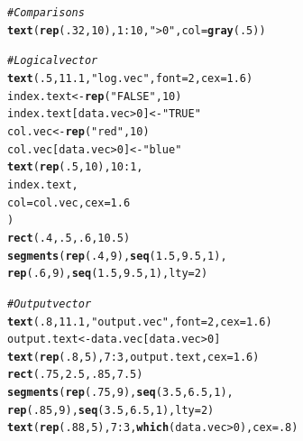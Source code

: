 \documentclass{tufte-book}\usepackage[]{graphicx}\usepackage[]{color}
\makeatletter
\newcommand{\hlnum}[1]{\textcolor[rgb]{0.686,0.059,0.569}{#1}}%
\newcommand{\hlstr}[1]{\textcolor[rgb]{0.192,0.494,0.8}{#1}}%
\newcommand{\hlcom}[1]{\textcolor[rgb]{0.678,0.584,0.686}{\textit{#1}}}%
\newcommand{\hlopt}[1]{\textcolor[rgb]{0,0,0}{#1}}%
\newcommand{\hlstd}[1]{\textcolor[rgb]{0.345,0.345,0.345}{#1}}%
\newcommand{\hlkwb}[1]{\textcolor[rgb]{0.69,0.353,0.396}{#1}}%
\newcommand{\hlkwc}[1]{\textcolor[rgb]{0.333,0.667,0.333}{#1}}%
\newcommand{\hlkwd}[1]{\textcolor[rgb]{0.737,0.353,0.396}{\textbf{#1}}}%
\newenvironment{kframe}{%
 \def\at@end@of@kframe{}%
 \ifinner\ifhmode%
  \def\at@end@of@kframe{\end{minipage}}%
  \begin{minipage}{\columnwidth}%
 \fi\fi%
 \def\FrameCommand##1{\hskip\@totalleftmargin \hskip-\fboxsep
 \colorbox{shadecolor}{##1}\hskip-\fboxsep
     \hskip-\linewidth \hskip-\@totalleftmargin \hskip\columnwidth}%
 \MakeFramed {\advance\hsize-\width
   \@totalleftmargin\z@ \linewidth\hsize
   \@setminipage}}%
 {\par\unskip\endMakeFramed%
 \at@end@of@kframe}
\newenvironment{knitrout}{}{} %
\makeatother
\begin{document}
\begin{marginfigure}
\begin{tiny}
\begin{knitrout}
\begin{kframe}
\begin{alltt}
\hlcom{# Comparisons}
\hlkwd{text}\hlstd{(}\hlkwd{rep}\hlstd{(}\hlnum{.32}\hlstd{,} \hlnum{10}\hlstd{),} \hlnum{1}\hlopt{:}\hlnum{10}\hlstd{,} \hlstr{"> 0"}\hlstd{,} \hlkwc{col} \hlstd{=} \hlkwd{gray}\hlstd{(}\hlnum{.5}\hlstd{))}

\hlcom{# Logical vector}
\hlkwd{text}\hlstd{(}\hlnum{.5}\hlstd{,} \hlnum{11.1}\hlstd{,} \hlstr{"log.vec"}\hlstd{,} \hlkwc{font} \hlstd{=} \hlnum{2}\hlstd{,} \hlkwc{cex} \hlstd{=} \hlnum{1.6}\hlstd{)}
\hlstd{index.text} \hlkwb{<-} \hlkwd{rep}\hlstd{(}\hlstr{"FALSE"}\hlstd{,} \hlnum{10}\hlstd{)}
\hlstd{index.text[data.vec} \hlopt{>} \hlnum{0}\hlstd{]} \hlkwb{<-} \hlstr{"TRUE"}
\hlstd{col.vec} \hlkwb{<-} \hlkwd{rep}\hlstd{(}\hlstr{"red"}\hlstd{,} \hlnum{10}\hlstd{)}
\hlstd{col.vec[data.vec} \hlopt{>} \hlnum{0}\hlstd{]} \hlkwb{<-} \hlstr{"blue"}
\hlkwd{text}\hlstd{(}\hlkwd{rep}\hlstd{(}\hlnum{.5}\hlstd{,} \hlnum{10}\hlstd{),} \hlnum{10}\hlopt{:}\hlnum{1}\hlstd{,}
     \hlstd{index.text,}
     \hlkwc{col} \hlstd{= col.vec,} \hlkwc{cex} \hlstd{=} \hlnum{1.6}
     \hlstd{)}
\hlkwd{rect}\hlstd{(}\hlnum{.4}\hlstd{,} \hlnum{.5}\hlstd{,} \hlnum{.6}\hlstd{,} \hlnum{10.5}\hlstd{)}
\hlkwd{segments}\hlstd{(}\hlkwd{rep}\hlstd{(}\hlnum{.4}\hlstd{,} \hlnum{9}\hlstd{),} \hlkwd{seq}\hlstd{(}\hlnum{1.5}\hlstd{,} \hlnum{9.5}\hlstd{,} \hlnum{1}\hlstd{),}
         \hlkwd{rep}\hlstd{(}\hlnum{.6}\hlstd{,} \hlnum{9}\hlstd{),} \hlkwd{seq}\hlstd{(}\hlnum{1.5}\hlstd{,} \hlnum{9.5}\hlstd{,} \hlnum{1}\hlstd{),} \hlkwc{lty} \hlstd{=} \hlnum{2}\hlstd{)}

\hlcom{# Output vector}
\hlkwd{text}\hlstd{(}\hlnum{.8}\hlstd{,} \hlnum{11.1}\hlstd{,} \hlstr{"output.vec"}\hlstd{,} \hlkwc{font} \hlstd{=} \hlnum{2}\hlstd{,} \hlkwc{cex} \hlstd{=} \hlnum{1.6}\hlstd{)}
\hlstd{output.text} \hlkwb{<-} \hlstd{data.vec[data.vec} \hlopt{>} \hlnum{0}\hlstd{]}
\hlkwd{text}\hlstd{(}\hlkwd{rep}\hlstd{(}\hlnum{.8}\hlstd{,} \hlnum{5}\hlstd{),} \hlnum{7}\hlopt{:}\hlnum{3}\hlstd{, output.text,} \hlkwc{cex} \hlstd{=} \hlnum{1.6}\hlstd{)}
\hlkwd{rect}\hlstd{(}\hlnum{.75}\hlstd{,} \hlnum{2.5}\hlstd{,} \hlnum{.85}\hlstd{,} \hlnum{7.5}\hlstd{)}
\hlkwd{segments}\hlstd{(}\hlkwd{rep}\hlstd{(}\hlnum{.75}\hlstd{,} \hlnum{9}\hlstd{),} \hlkwd{seq}\hlstd{(}\hlnum{3.5}\hlstd{,} \hlnum{6.5}\hlstd{,} \hlnum{1}\hlstd{),}
         \hlkwd{rep}\hlstd{(}\hlnum{.85}\hlstd{,} \hlnum{9}\hlstd{),} \hlkwd{seq}\hlstd{(}\hlnum{3.5}\hlstd{,} \hlnum{6.5}\hlstd{,} \hlnum{1}\hlstd{),} \hlkwc{lty} \hlstd{=} \hlnum{2}\hlstd{)}
\hlkwd{text}\hlstd{(}\hlkwd{rep}\hlstd{(}\hlnum{.88}\hlstd{,} \hlnum{5}\hlstd{),} \hlnum{7}\hlopt{:}\hlnum{3}\hlstd{,} \hlkwd{which}\hlstd{(data.vec} \hlopt{>} \hlnum{0}\hlstd{),} \hlkwc{cex} \hlstd{=} \hlnum{.8}\hlstd{)}


\end{alltt}
\end{kframe}
\end{knitrout}
\end{tiny}
\end{marginfigure}
\end{document}
